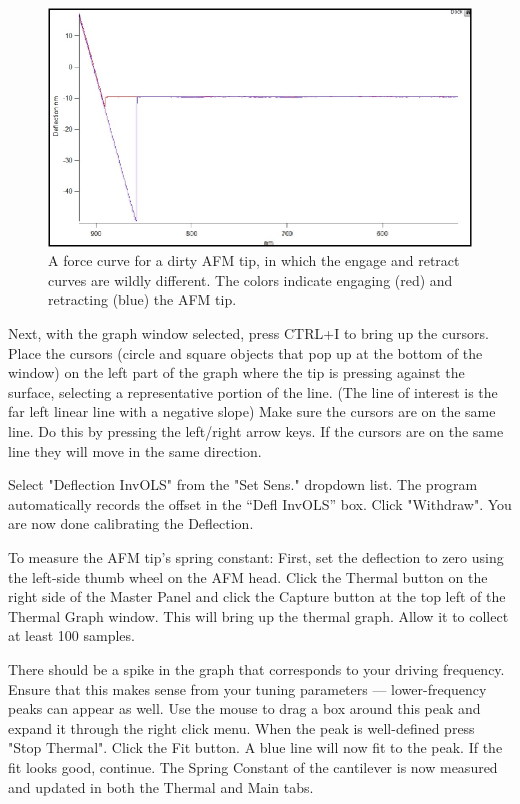 \documentclass[double,12pt,1in,seploa]{beavtex}
\begin{document}
\begin{figure}
    \includegraphics{force curve.pdf}
    \caption{A force curve for a dirty AFM tip, in which the engage and retract curves are wildly different. The colors indicate engaging (red) and retracting (blue) the AFM tip.}
    \label{force curve}
\end{figure}

Next, with the graph window selected, press CTRL+I to bring up the cursors. Place the cursors (circle and square objects that pop up at the bottom of the window) on the left part of the graph where the tip is pressing against the surface, selecting a representative portion of the line. (The line of interest is the far left linear line with a negative slope) Make sure the cursors are on the same line. Do this by pressing the left/right arrow keys. If the cursors are on the same line they will move in the same direction.

Select "Deflection InvOLS" from the "Set Sens." dropdown list. The program automatically records the offset in the “Defl InvOLS” box. Click "Withdraw". You are now done calibrating the Deflection.
   
To measure the AFM tip's spring constant: First, set the deflection to zero using the left-side thumb wheel on the AFM head. Click the Thermal button on the right side of the Master Panel and click the Capture button at the top left of the Thermal Graph window. This will bring up the thermal graph. Allow it to collect at least 100 samples.

There should be a spike in the graph that corresponds to your driving frequency. Ensure that this makes sense from your tuning parameters — lower-frequency peaks can appear as well. Use the mouse to drag a box around this peak and expand it through the right click menu. When the peak is well-defined press "Stop Thermal". Click the Fit button. A blue line will now fit to the peak. If the fit looks good, continue. The Spring Constant of the cantilever is now measured and updated in both the Thermal and Main tabs.
\end{document}
